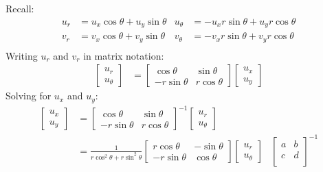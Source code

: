 \documentclass[12pt, english]{book}
\makeatletter
\renewenvironment{proof}[1][\proofname]{\par
	\pushQED{\qed}%
	\normalfont \topsep6\p@\@plus6\p@\relax
	\list{}{%
		\settowidth{\leftmargin}{\itshape\proofname:\hskip\labelsep}%
		\setlength{\labelwidth}{0pt}%
		\setlength{\itemindent}{-\leftmargin}%
	}%
	\item[\hskip\labelsep\itshape#1\@addpunct{:}]\ignorespaces
	}{ \popQED\endlist\@endpefalse}
\makeatother
\begin{document}
\begin{proof}
		{\color{Grey}
			Recall:
			\begin{align*}
				u_r &= u_x \cos \theta + u_y \sin \theta 
				&	u_\theta &= -u_x r \sin \theta + u_y r \cos \theta \\
				v_r &= v_x \cos \theta + v_y \sin \theta 
				&	v_\theta &= -v_x r \sin \theta + v_y r \cos \theta \\
			\end{align*}
			Writing \(u_r\) and \(v_r\) in matrix notation: 
			\begin{align*}
				\begin{bmatrix}
					u_r \\ u_\theta
				\end{bmatrix}
				&= 
				\begin{bmatrix}
					\cos\theta & \sin\theta \\
					-r\sin\theta & r\cos\theta
				\end{bmatrix}
				\begin{bmatrix}
					u_x \\ u_y
				\end{bmatrix}
			\end{align*}
			Solving for \(u_x\) and \(u_y\):
			\begin{align*}
				\begin{bmatrix}
					u_x \\ u_y
				\end{bmatrix}
				&=
					\begin{bmatrix}
						\cos\theta & \sin\theta \\
						-r\sin\theta & r\cos\theta
					\end{bmatrix}^{-1}
					\begin{bmatrix}
						u_r \\ u_\theta
					\end{bmatrix} & \\
				&= \frac{1}{r \cos^2\theta + r \sin^2\theta}
					\begin{bmatrix}
						r\cos\theta & -\sin\theta \\
						-r\sin\theta & \cos\theta
					\end{bmatrix}
					\begin{bmatrix}
						u_r \\ u_\theta
					\end{bmatrix} 
					& \begin{bmatrix}
						a & b \\
						c & d \\
					  \end{bmatrix}^{-1}

\end{align*}}
\end{proof}
\end{document}
